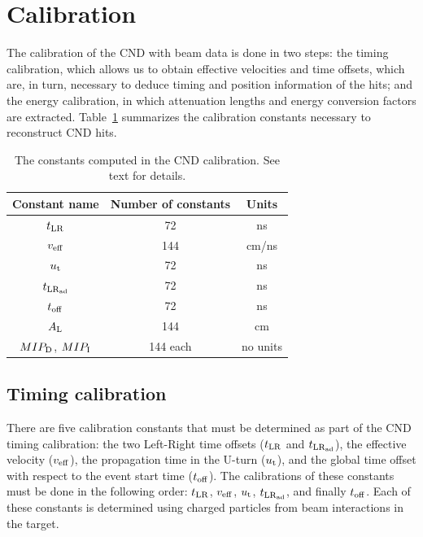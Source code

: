 \section{Calibration}\label{sec_cnd_calib}

The calibration of the CND with beam data is done in two steps: the timing calibration, which allows us to obtain effective velocities and time offsets, which are, in turn, necessary to deduce timing and position information of the hits; and the energy calibration, in which attenuation lengths and energy conversion factors are extracted.
Table~\ref{table_cnd_constants} summarizes the calibration constants necessary to reconstruct CND hits.

\begin{table}
\begin{tabular}{|c|c|c|}
\hline
Constant name & Number of constants  & Units \\
\hline
$t_{\rm{LR}}$ & 72 & ns\\
\hline
$v_{\rm{eff}}$ & 144 & cm/ns \\
\hline
$u_{\rm{t}}$ & 72 & ns \\
\hline
$t_{\rm{LR}_{\rm{ad}}}$ & 72 & ns \\
\hline
$t_{\rm{off}}$ &72 & ns\\
\hline
$A_{\rm{L}}$ & 144 & cm\\
\hline
$MIP_{\rm{D}}$, $MIP_{\rm{I}}$ & 144 each & no units \\
\hline
\end{tabular}
\caption{The constants computed in the CND calibration. See text for details.}
\label{table_cnd_constants}
\end{table}

\subsection{Timing calibration}\label{sec_timing_calib}
There are five calibration constants that must be determined as part of the CND timing calibration: the two Left-Right time offsets ($t_{\rm{LR}}$ and  $t_{\rm{LR}_{\rm{ad}}}$), the effective velocity ($v_{\rm{eff}}$), the propagation time in the U-turn ($u_{\rm{t}}$), and the global time offset with respect to the event start time ($t_{\rm{off}}$). The calibrations of these constants must be done in the following order: $t_{\rm{LR}}$, $v_{\rm{eff}}$, $u_{\rm{t}}$,  $t_{\rm{LR}_{\rm{ad}}}$, and finally $t_{\rm{off}}$. 
Each of these constants is determined using charged particles from beam interactions in the target.

